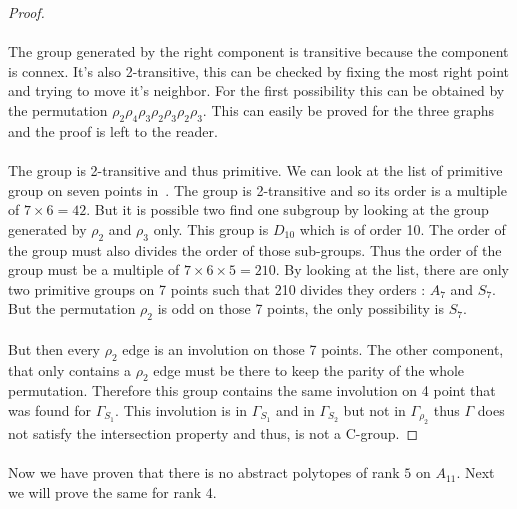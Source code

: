 \begin{proof}
  \paragraph{}
  The group generated by the right component is transitive because the component is connex. It's also 2-transitive, this can be checked by fixing the most right point and trying to move it's neighbor. For the first possibility this can be obtained by the permutation $\rho_2 \rho_4 \rho_3 \rho_2 \rho_3 \rho_2 \rho_3$. This can easily be proved for the three graphs and the proof is left to the reader.

  \paragraph{}
  The group is 2-transitive and thus primitive. We can look at the list of primitive group on seven points in~\cite{buekenhout1996list}. The group is 2-transitive and so its order is a multiple of $7 \times 6 = 42$. But it is possible two find one subgroup by looking at the group generated by $\rho_2$ and $\rho_3$ only. This group is $D_10$ which is of order 10. The order of the group must also divides the order of those sub-groups. Thus the order of the group must be a multiple of $7 \times 6 \times 5 = 210$. By looking at the list, there are only two primitive groups on 7 points such that 210 divides they orders : $A_7$ and $S_7$. But the permutation $\rho_2$ is odd on those 7 points, the only possibility is $S_7$.

  \paragraph{}
  But then every $\rho_2$ edge is an involution on those 7 points. The other component, that only contains a $\rho_2$ edge must be there to keep the parity of the whole permutation. Therefore this group contains the same involution on 4 point that was found for $\Gamma_{S_1}$. This involution is in $\Gamma_{S_1}$ and in $\Gamma_{S_2}$ but not in $\Gamma_{\rho_2}$ thus $\Gamma$ does not satisfy the intersection property and thus, is not a C-group.

\end{proof}

\paragraph{}
Now we have proven that there is no abstract polytopes of rank $5$ on $A_{11}$. Next we will prove the same for rank 4.
